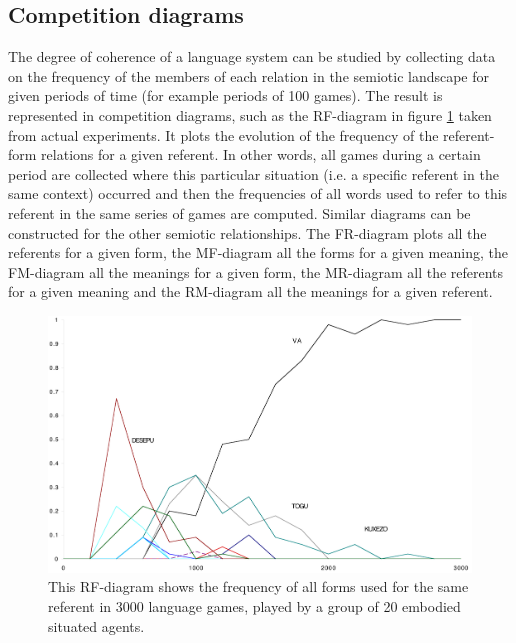 \subsection{Competition diagrams}

The degree of coherence of a language system can be studied
by collecting data on the frequency of the members of 
each relation in the semiotic landscape for given periods of time
(for example periods of 100 games). The result is represented in
competition diagrams, such as the RF-diagram in figure
\ref{RF-diagram} taken from actual experiments. 
It plots the evolution of the frequency
of the referent-form relations for a given
referent. In other words, all games during a certain 
period are collected where this particular situation (i.e. 
a specific referent in the same context) occurred 
and then the frequencies of all words used to refer 
to this referent in the same series of games are computed. 
Similar diagrams can be constructed for the other
semiotic relationships. The FR-diagram plots all the referents
for a given form, the MF-diagram all the forms for a 
given meaning, the FM-diagram all the meanings for a 
given form, the MR-diagram all the referents for a given 
meaning and the RM-diagram all the meanings for a given 
referent. 

\begin{figure}[htbp]
  \centerline{\includegraphics[width=.80\textwidth]{chap7/figs/rf.pdf}}
\caption{\label{RF-diagram}This RF-diagram shows
the frequency of all forms used for the same referent in 
3000 language games, played by a group of 20 embodied
situated agents.}
\end{figure}

